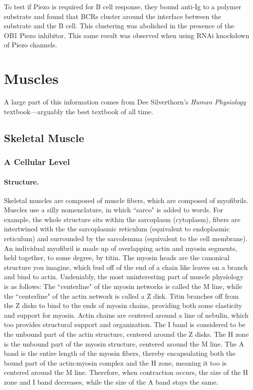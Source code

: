 \documentclass[12pt]{report}
\begin{document}
To test if Piezo is required for B cell response, they bound anti-Ig to a polymer substrate and found that BCRs cluster around the interface between the substrate and the B cell. This clustering was abolished in the presence of the OB1 Piezo inhibitor. This same result was observed when using RNAi knockdown of Piezo channels. 


\chapter{Muscles}

A large part of this information comes from Dee Silverthorn's \textit{Human Physiology} textbook---arguably the best textbook of all time. 

\section{Skeletal Muscle}
\subsection{A Cellular Level}
\subsubsection{Structure.}
Skeletal muscles are composed of muscle fibers, which are composed of myofibrils. Muscles use a silly nomenclature, in which ``sarco" is added to words. For example, the whole structure sits within the sarcoplasm (cytoplasm), fibers are intertwined with the the sarcoplasmic reticulum (equivalent to endoplasmic reticulum) and surrounded by the sarcolemma (equivalent to the cell membrane). An individual myofibril is made up of overlapping actin and myosin segments, held together, to some degree, by titin. The myosin heads are the canonical structure you imagine, which bud off of the end of a chain like leaves on a branch and bind to actin. Undeniably, the most uninteresting part of muscle physiology is as follows: The ``centerline" of the myosin networks is called the M line, while the ``centerline" of the actin network is called a Z disk. Titin branches off from the Z disks to bind to the ends of myosin chains, providing both some elasticity and support for myosin. Actin chains are centered around a line of nebulin, which too provides structural support and organization. The I band is considered to be the unbound part of the actin structure, centered around the Z disks. The H zone is the unbound part of the myosin structure, centered around the M line. The A band is the entire length of the myosin fibers, thereby encapsulating both the bound part of the actin-myosin complex and the H zone, meaning it too is centered around the M line. Therefore, when contraction occurs, the size of the H zone and I band decreases, while the size of the A band stays the same.
\end{document}

